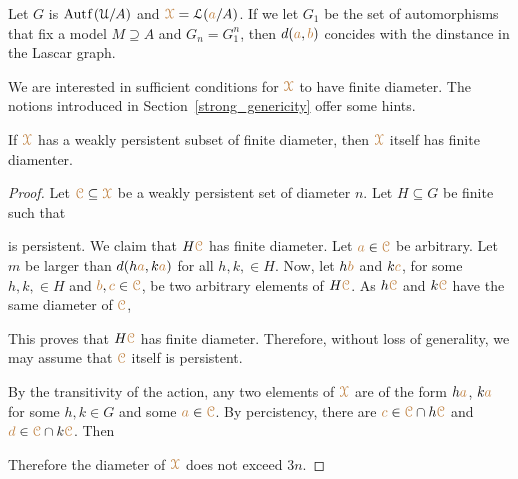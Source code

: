 \begin{example}
  Let $G$ is $\mathord{\rm Aut\kern.15ex{f}\kern.15ex}(\EuScript U/A)$ and ${\color{brown}\EuScript X}=\EuScript L({\color{brown} a}/A)$.
  If we let $G_1$ be the set of automorphisms that fix a model $M\supseteq A$ and $G_n=G_1^n$, then $d({\color{brown} a},{\color{brown} b})$ concides with the dinstance in the Lascar graph.
\end{example} 

We are interested in sufficient conditions for ${\color{brown}\EuScript X}$ to have finite diameter.
The notions introduced in Section~\ref{strong_genericity} offer some hints.

\begin{proposition}\label{prop_wpers_finite_diameter}
  If ${\color{brown}\EuScript X}$ has a weakly persistent subset of finite diameter, then ${\color{brown}\EuScript X}$ itself has finite diamenter.
\end{proposition}

\begin{proof}
  Let ${\color{brown}\EuScript C}\subseteq{\color{brown}\EuScript X}$ be a weakly persistent set of diameter $n$.
  Let $H\subseteq G$ be finite such that 


  is persistent.
  We claim that $H{\color{brown}\EuScript C}$ has finite diameter.
  Let ${\color{brown} a}\in{\color{brown}\EuScript C}$ be arbitrary.
  Let $m$ be larger than $d(h{\color{brown} a}, k{\color{brown} a})$ for all $h,k,\in H$.
  Now, let $h{\color{brown} b}$ and $k{\color{brown} c}$, for some $h,k,\in H$ and ${\color{brown} b},{\color{brown} c}\in{\color{brown}\EuScript C}$, be two arbitrary elements of $H{\color{brown}\EuScript C}$.
  As $h{\color{brown}\EuScript C}$ and $k{\color{brown}\EuScript C}$ have the same diameter of ${\color{brown}\EuScript C}$, 



  This proves that $H{\color{brown}\EuScript C}$ has finite diameter.
  Therefore, without loss of generality, we may assume that ${\color{brown}\EuScript C}$ itself is persistent.
  
  By the transitivity of the action, any two elements of ${\color{brown}\EuScript X}$ are of the form $h{\color{brown} a}$, $k{\color{brown} a}$ for some $h,k\in G$ and some ${\color{brown} a}\in{\color{brown}\EuScript C}$.
  By percistency, there are ${\color{brown} c}\in{\color{brown}\EuScript C}\cap h{\color{brown}\EuScript C}$ and ${\color{brown} d}\in{\color{brown}\EuScript C}\cap k{\color{brown}\EuScript C}$.
  Then 



  Therefore the diameter of ${\color{brown}\EuScript X}$ does not exceed $3n$.
\end{proof}

